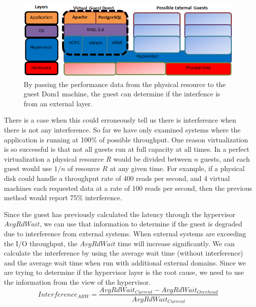 \begin{figure}[!h]
  \begin{center}
  \includegraphics[width=6in]{images/LayersVirtualWithDisk.png}
  \caption{By passing the performance data from the physical resource to the guest Dom1 machine, the guest can determine if the interfence is from an external layer.} 
  \label{LayersAndResources}
  \end{center}
\end{figure}

There is a case when this could erroneously tell us there is interference when there is not any interference.  So far we have only examined systems where the application is running at 100\% of possible throughput.  One reason virtualization is so successful is that not all guests run at full capacity at all times.  In a perfect virtualization a physical resource $R$ would be divided between $n$ guests, and each guest would use $1/n$ of resource $R$ at any given time.  For example, if a physical disk could handle a throughput rate of 400 reads per second, and 4 virtual machines each requested data at a rate of 100 reads per second, then the previous method would report 75\% interference.  

Since the guest has previously calculated the latency through the hypervisor $AvgRdWait$, we can use that information to determine if the guest is degraded due to interference from external systems.  When external systems are exceeding the I/O throughput, the $AvgRdWait$ time will increase significantly.  We can calculate the interference by using the average wait time (without interference) and the average wait time when run with additional external domains.  Since we are trying to determine if the hypervisor layer is the root cause, we need to use the information from the view of the hypervisor.
\begin{equation}
	Interference_{ARW} = \frac{AvgRdWait_{Current} - AvgRdWait_{Overhead}}{AvgRdWait_{Current}} 
\end{equation}

